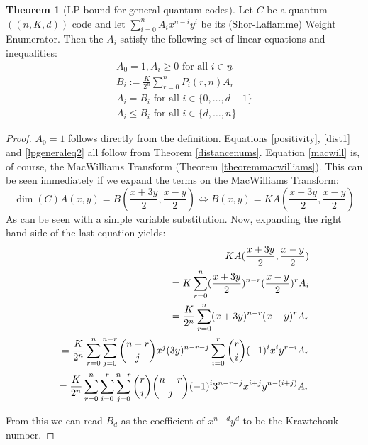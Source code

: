 \documentclass[12pt,a4paper,BCOR15mm,twoside,DIV12]{article}
\def\n{\underline{n}}
\def\fa{\text{ for all }}
\theoremstyle{definition}
\newtheorem{theorem}[Satz]{Theorem}
\begin{document}
\begin{theorem}[LP bound for general quantum codes]\label{lpgeneral}
Let $C$ be a quantum $((n,K,d))$ code and let $\sum_{i=0}^n A_i x^{n-i} y^{i}$ be its (Shor-Laflamme) Weight Enumerator. Then the $A_i$ satisfy the following set of linear equations and inequalities:
\begin{align}
A_0 = 1, A_i \geq 0 \fa i \in \n \label{positivity}\\
B_i := \frac{K}{2^{n}} \sum_{r=0}^n P_i(r,n) A_r  \label{macwill}\\
A_i = B_i \fa i \in \{0, \ldots, d-1 \} \label{dist1}\\
A_i \leq B_i \fa i \in \{d, \ldots, n \} \label{lpgeneraleq2}
\end{align}
\begin{proof}
$A_0 = 1$ follows directly from the definition. Equations \ref{positivity}, \ref{dist1} and \ref{lpgeneraleq2} all follow from Theorem \ref{distancenums}. 
Equation \ref{macwill} is, of course, the MacWilliams Transform (Theorem \ref{theoremmacwilliams}). This can be seen immediately if we expand the terms on the MacWilliams Transform:
\begin{equation}
\dim (C) A(x,y) =  B(\frac{x+3y}{2},\frac{x-y}{2}) \Leftrightarrow B(x,y) = K A(\frac{x+3y}{2},\frac{x-y}{2}) 
\end{equation}
As can be seen with a simple variable substitution. Now, expanding the right hand side of the last equation yields:
\begin{align}
 K A(\frac{x+3y}{2},\frac{x-y}{2})  \notag \\
 = K \sum_{r=0}^n  (\frac{x+3y}{2})^{n-r} (\frac{x-y}{2})^r A_i \notag \\  = 
\frac{K}{2^n} \sum_{r=0}^n (x+3y)^{n-r}(x-y)^r A_r   \notag \\
 = \frac{K}{2^n} \sum_{r=0}^n \sum_{j=0}^{n-r} \binom{n-r}{j}x^j(3y)^{n-r-j} \sum_{i=0}^r \binom{r}{i}(-1)^ix^iy^{r-i} A_r \notag \\
 = \frac{K}{2^n} \sum_{r=0}^n \sum_{i=0}^r \sum_{j=0}^{n-r} \binom{r}{i} \binom{n-r}{j} (-1)^i 3^{n-r-j} x^{i+j} y^{n-(i+j)} A_r
\end{align}

From this we can read $B_d$ as the coefficient of $x^{n-d}y^d$ to be the Krawtchouk number.
\end{proof}
\end{theorem}
\end{document}
